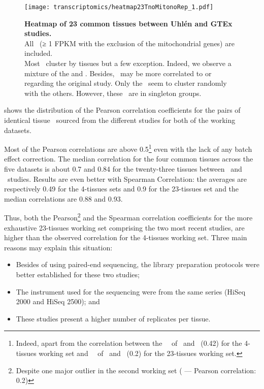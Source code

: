 \begin{figure}[!htpb]
    \texttt{[image: transcriptomics/heatmap23TnoMitonoRep\_1.pdf]}\centering
    \caption[Heatmap of 23 common tissues between Uhlén and GTEx studies]%
    {\label{fig:noMitoNoRep23T}%
    \textbf{Heatmap of 23 common tissues between Uhlén and GTEx studies.}\\
    All \pcgs\ (≥ 1 FPKM with the exclusion of the mitochondrial
    genes) are included.\\Most \treps\ cluster by tissues but a few exception.
    Indeed, we observe a mixture of the 
    and  \treps.
    Besides,  \treps\ may be more correlated to
     or  regarding the original study.
    Only the  \treps\ seem to cluster randomly with the others.
    However, these \treps\ are in singleton groups.}
\end{figure}

 shows the distribution of the Pearson correlation
coefficients for the pairs of identical tissue \treps\
sourced from the different studies
for both of the working datasets.

Most of the Pearson correlations are above 0.5\footnote{Indeed, apart from the
correlation between the \Testis\ \treps\ of \castle\ and \vt\ (0.42)
for the 4-tissues working set and
\Salivary\ \treps\ of \uhlen\ and \gtex\ (0.2)
for the 23-tissues working set.}
even with the lack of any batch effect correction.
The median correlation for the four common tissues across the five datasets is
about 0.7 and 0.84 for the twenty-three tissues between \uhlen\ and \gtex\ studies.
Results are even better with Spearman Correlation:
the averages are respectively 0.49 for the 4-tissues sets
and 0.9 for the 23-tissues set and
the median correlations are 0.88 and 0.93.

Thus, both the Pearson\footnote{Despite one major outlier in the second
working set (\tissue{Salivary gland} --- Pearson correlation: 0.2)} and the
Spearman correlation coefficients for the more exhaustive 23-tissues working set
comprising the two most recent studies,
are higher than the observed correlation for the 4-tissues working set.
Three main reasons may explain this situation:
\begin{itemize}[topsep=0pt,nosep]
    \item Besides of using paired-end sequencing,
        the library preparation protocols were better established
        for these two studies;
    \item The instrument used for the sequencing were
        from the same series (HiSeq 2000 and HiSeq 2500); and
    \item These studies present a higher number of replicates per tissue.
\end{itemize}

